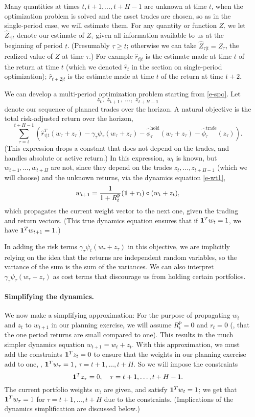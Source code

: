 \documentclass[openany]{article}  %
\newcommand{\trcosthat}{\hat \phi^\mathrm{trade}}
\newcommand{\hldcosthat}{\hat \phi^\mathrm{hold}}
\newcommand{\Rp}{R^\mathrm{p}}
\begin{document}
Many quantities at times $t,t+1, \ldots, t+H-1$ are unknown at time $t$,
when the optimization problem is solved and the asset trades are chosen,
so as in the single-period case, we will estimate them.
For any quantity or function $Z$, we let $\hat Z_{\tau|t}$ denote our estimate
of $Z_\tau$ given all information available to us at the beginning of period $t$.
(Presumably $\tau \geq t$; otherwise we can take $\hat Z_{\tau|t}=Z_\tau$, the
realized value of $Z$ at time $\tau$.)
For example $\hat r_{t|t}$ is the estimate made at time $t$ of the return at time
$t$ (which we denoted $\hat r_t$ in the section on single-period optimization);
$\hat r_{t+2|t}$ is the estimate made at time $t$ of the return at time $t+2$.

We can develop a multi-period optimization problem
starting from \eqref{e-spo}.
Let
\[
z_t,~ z_{t+1},~ \ldots, ~z_{t+H-1}
\]
denote our sequence of planned trades over the horizon.
A natural objective is the total risk-adjusted return over the
horizon,
\[
\sum_{\tau=t}^{t+H-1} \left( \hat r_{\tau|t}^T (w_\tau + z_\tau)
-\gamma_\tau \psi_\tau(w_\tau+z_\tau)  - \hldcosthat_\tau (w_\tau + z_\tau)
- \trcosthat_\tau (z_\tau)\right).
\]
(This expression drops a constant that does not depend on the trades,
and handles absolute or active return.)
In this expression, $w_t$ is known, but $w_{t+1}, \ldots, w_{t+H}$ are not,
since they depend on the trades $z_t, \ldots, z_{t+H-1}$
(which we will choose) and the unknown returns,
via the dynamics equation \eqref{e-wt1},
\[
w_{t+1} = \frac{1}{1+\Rp_t} (\ones + r_t) \circ (w_t+z_t),
\]
which propagates the current weight vector
to the next one, given the trading and return vectors.
(This true dynamics equation ensures that if $\mathbf 1^Tw_t=1$,
we have $\mathbf 1^Tw_{t+1}=1$.)

In adding the risk terms $\gamma_\tau \psi_t(w_\tau+z_\tau)$ in this objective,
we are implicitly relying on the idea that the returns are independent
random variables, so the variance of the sum is the sum of the
variances.
We can also interpret $\gamma_\tau \psi_\tau(w_\tau+z_\tau)$ as
cost terms that discourage us from holding certain portfolios.

\paragraph{Simplifying the dynamics.}
We now make a simplifying approximation:  For the purpose of propagating
$w_t$ and $z_t$ to $w_{t+1}$ in our planning exercise,
we will assume $\Rp_t=0$ and $r_t=0$
(\ie, that the one period returns are small compared to one).
This results in the much simpler dynamics equation
$w_{t+1} = w_t + z_t$.
With this approximation, we must add the constraints
$\mathbf 1^Tz_t = 0$ to ensure that the weights in our planning
exercise add to one, \ie, $\mathbf 1^T w_\tau=1$, $\tau=t+1,\ldots, t+H$.
So we will impose the
constraints
\[
\mathbf 1^Tz_\tau = 0, \quad \tau=t+1,\ldots,t+H-1.
\]
The current portfolio weights $w_t$ are given, and satisfy $\mathbf 1^T w_t=1$;
we get that $\mathbf 1^Tw_\tau = 1$ for $\tau=t+1,\ldots,t+H$ due to the
constraints.
(Implications of the dynamics simplification are discussed below.)
\end{document}
